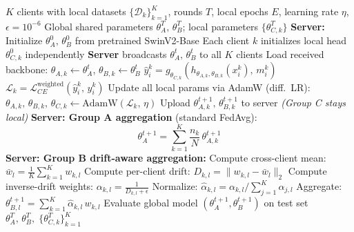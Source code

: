 \documentclass{ieeeaccess}
\newcommand{\sadrift}{FedSA-Drift}
\begin{document}
\begin{algorithm}[t]
\caption{\sadrift{}: Structure-Aware Federated Training with Drift-Aware Aggregation}
\label{alg:federated}
\begin{algorithmic}[1]
\REQUIRE $K$ clients with local datasets $\{\mathcal{D}_k\}_{k=1}^K$, rounds $T$, local epochs $E$, learning rate $\eta$, $\epsilon = 10^{-6}$
\ENSURE Global shared parameters $\theta_A^T,\, \theta_B^T$; local parameters $\{\theta_{C,k}^T\}$
\STATE \textbf{Server:} Initialize $\theta_A^0,\, \theta_B^0$ from pretrained SwinV2-Base
\STATE Each client $k$ initializes local head $\theta_{C,k}^0$ independently
    \STATE \textbf{Server} broadcasts $\theta_A^t,\, \theta_B^t$ to all $K$ clients
        \STATE Load received backbone: $\theta_{A,k} \leftarrow \theta_A^t$,\; $\theta_{B,k} \leftarrow \theta_B^t$
                \STATE $\hat{y}_i^k = g_{\theta_{C,k}}\!\left(h_{\theta_{A,k},\theta_{B,k}}(x_i^k),\, m_i^k\right)$
                \STATE $\mathcal{L}_k = \mathcal{L}_{CE}^{\text{weighted}}(\hat{y}_i^k,\, y_i^k)$
                \STATE Update all local params via AdamW (diff.\ LR):
                       $\theta_{A,k},\, \theta_{B,k},\, \theta_{C,k} \leftarrow \text{AdamW}(\mathcal{L}_k,\,\eta)$
            \ENDFOR
        \ENDFOR
        \STATE Upload $\theta_{A,k}^{t+1},\, \theta_{B,k}^{t+1}$ to server \quad \textit{(Group C stays local)}
    \ENDFOR
    \STATE \textbf{Server: Group A aggregation} (standard FedAvg):
           \[ \theta_A^{t+1} = \sum_{k=1}^{K} \frac{n_k}{N}\, \theta_{A,k}^{t+1} \]
    \STATE \textbf{Server: Group B drift-aware aggregation:}
        \STATE Compute cross-client mean:
               $\bar{w}_l = \frac{1}{K}\sum_{k=1}^{K} w_{k,l}$
        \STATE Compute per-client drift:
               $D_{k,l} = \|w_{k,l} - \bar{w}_l\|_2$
        \STATE Compute inverse-drift weights:
               $\alpha_{k,l} = \frac{1}{D_{k,l} + \epsilon}$
        \STATE Normalize:
               $\hat{\alpha}_{k,l} = \alpha_{k,l} \big/ \sum_{j=1}^{K} \alpha_{j,l}$
        \STATE Aggregate:
               $\theta_{B,l}^{t+1} = \sum_{k=1}^{K} \hat{\alpha}_{k,l}\, w_{k,l}$
    \ENDFOR
    \STATE Evaluate global model $(\theta_A^{t+1}, \theta_B^{t+1})$ on test set
\ENDFOR
\RETURN $\theta_A^T,\, \theta_B^T,\; \{\theta_{C,k}^T\}_{k=1}^K$
\end{algorithmic}
\end{algorithm}
\end{document}
